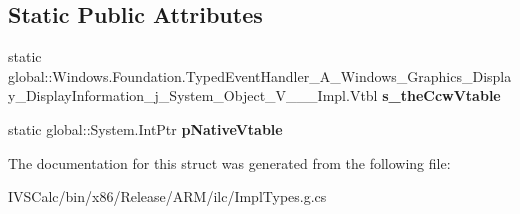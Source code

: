 \subsection*{Static Public Attributes}
\begin{DoxyCompactItemize}
\item 
\mbox{\label{struct_windows_1_1_foundation_1_1_typed_event_handler___a___windows___graphics___display___displ2d6db8e7cf1fc629bdbfb5ccc4ead7c7_a1b0ae82453be7a4ff38d35fd5759873a}} 
static global\+::\+Windows.\+Foundation.\+Typed\+Event\+Handler\+\_\+\+A\+\_\+\+Windows\+\_\+\+Graphics\+\_\+\+Display\+\_\+\+Display\+Information\+\_\+j\+\_\+\+System\+\_\+\+Object\+\_\+\+V\+\_\+\+\_\+\+\_\+\+Impl.\+Vtbl {\bfseries s\+\_\+the\+Ccw\+Vtable}
\item 
\mbox{\label{struct_windows_1_1_foundation_1_1_typed_event_handler___a___windows___graphics___display___displ2d6db8e7cf1fc629bdbfb5ccc4ead7c7_a79839d188622849d77f0bdf34a32504e}} 
static global\+::\+System.\+Int\+Ptr {\bfseries p\+Native\+Vtable}
\end{DoxyCompactItemize}


The documentation for this struct was generated from the following file\+:\begin{DoxyCompactItemize}
\item 
I\+V\+S\+Calc/bin/x86/\+Release/\+A\+R\+M/ilc/Impl\+Types.\+g.\+cs\end{DoxyCompactItemize}
